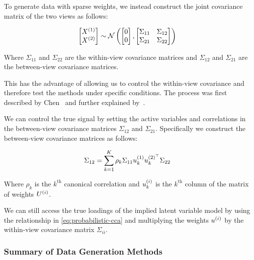 To generate data with sparse weights, we instead construct the joint covariance matrix\citep{mai2019iterative,chen2013sparse} of the two views as follows:

\begin{align}\label{eq:covariance}
    \begin{bmatrix} X^{(1)} \\ X^{(2)} \end{bmatrix} \sim \mathcal{N} \left( \begin{bmatrix} 0 \\ 0 \end{bmatrix}, \begin{bmatrix} \Sigma_{11} & \Sigma_{12} \\ \Sigma_{21} & \Sigma_{22} \end{bmatrix} \right)
\end{align}

Where $\Sigma_{11}$ and $\Sigma_{22}$ are the within-view covariance matrices and $\Sigma_{12}$ and $\Sigma_{21}$ are the between-view covariance matrices.

This has the advantage of allowing us to control the within-view covariance and therefore test the methods under specific conditions.
The process was first described by Chen~\citep{chen2013sparse} and further explained by~\citep{suo2017sparse}.

We can control the true signal by setting the active variables and correlations in the between-view covariance matrices $\Sigma_{12}$ and $\Sigma_{21}$.
Specifically we construct the between-view covariance matrices as follows:

\begin{align}
    \Sigma_{12}=\sum_{k=1}^{K}\rho_k\Sigma_{11}u^{(1)}_{k}u^{(2)^{\top}}_k\Sigma_{22}
\end{align}

Where $\rho_k$ is the $k^{\text{th}}$ canonical correlation and $u^{(i)}_k$ is the $k^{\text{th}}$ column of the matrix of weights $U^{(i)}$.

We can still access the true loadings of the implied latent variable model by using the relationship in \ref{eq:probabilistic-cca} and multiplying the weights $u^{(i)}$ by the within-view covariance matrix $\Sigma_{ii}$.

\subsubsection{Summary of Data Generation Methods}

